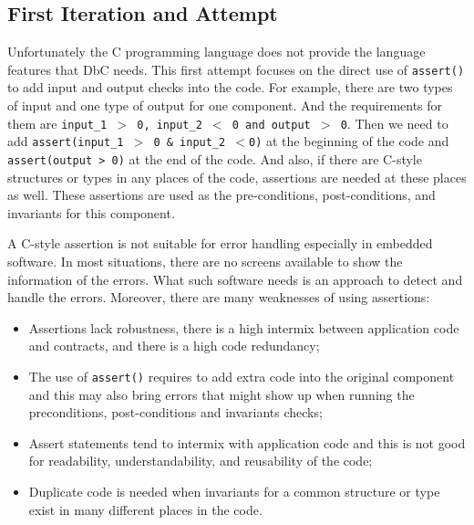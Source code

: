 
\subsection{First Iteration and Attempt}
Unfortunately the C programming language does not provide the language features that DbC needs. This first attempt focuses on the direct use of \texttt{assert()} to add input and output checks into the code. For example, there are two types of input and one type of output for one component. And the requirements for them are \texttt{input\_1 $>$ 0, input\_2 $<$ 0 and output $>$ 0}. Then we need to add \texttt{assert(input\_1 $>$ 0 \& input\_2 $<$0)} at the beginning of the code and \texttt{assert(output >  0)} at the end of the code. And also, if there are C-style structures or types in any places of the code, assertions are needed at these places as well. These assertions are used as the pre-conditions, post-conditions, and invariants for this component.


 A C-style assertion is not suitable for error handling especially in embedded software. In most situations, there are no screens available to show the information of the errors. What such software needs is an approach to detect and handle the errors. Moreover, there are many weaknesses of using assertions:

\begin{itemize}
\item Assertions lack robustness, there is a high intermix between application code and contracts, and there is a high code redundancy; 
\item The use of \texttt{assert()} requires to add extra code into the original component and this may also bring errors that might show up when running the preconditions, post-conditions and invariants checks;
\item Assert statements tend to intermix with application code and this is not good for readability, understandability, and reusability of the code;
\item Duplicate code is needed when invariants for a common structure or type exist in many different places in the code. 
\end{itemize}

